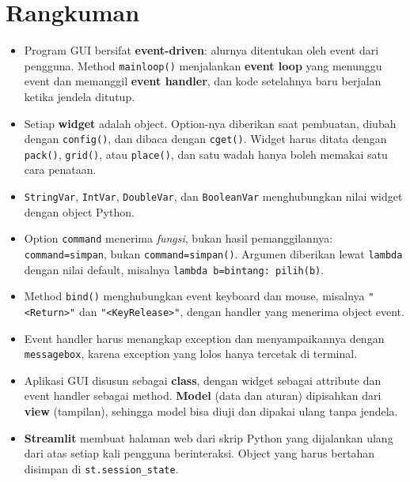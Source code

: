 \section{Rangkuman}

\begin{itemize}
  \item Program GUI bersifat \textbf{event-driven}: alurnya ditentukan oleh event dari pengguna. Method \texttt{mainloop()} menjalankan \textbf{event loop} yang menunggu event dan memanggil \textbf{event handler}, dan kode setelahnya baru berjalan ketika jendela ditutup.
  \item Setiap \textbf{widget} adalah object. Option-nya diberikan saat pembuatan, diubah dengan \texttt{config()}, dan dibaca dengan \texttt{cget()}. Widget harus ditata dengan \texttt{pack()}, \texttt{grid()}, atau \texttt{place()}, dan satu wadah hanya boleh memakai satu cara penataan.
  \item \texttt{StringVar}, \texttt{IntVar}, \texttt{DoubleVar}, dan \texttt{BooleanVar} menghubungkan nilai widget dengan object Python.
  \item Option \texttt{command} menerima \emph{fungsi}, bukan hasil pemanggilannya: \texttt{command=simpan}, bukan \texttt{command=simpan()}. Argumen diberikan lewat \texttt{lambda} dengan nilai default, misalnya \texttt{lambda b=bintang: pilih(b)}.
  \item Method \texttt{bind()} menghubungkan event keyboard dan mouse, misalnya \texttt{"<Return>"} dan \texttt{"<KeyRelease>"}, dengan handler yang menerima object event.
  \item Event handler harus menangkap exception dan menyampaikannya dengan \texttt{messagebox}, karena exception yang lolos hanya tercetak di terminal.
  \item Aplikasi GUI disusun sebagai \textbf{class}, dengan widget sebagai attribute dan event handler sebagai method. \textbf{Model} (data dan aturan) dipisahkan dari \textbf{view} (tampilan), sehingga model bisa diuji dan dipakai ulang tanpa jendela.
  \item \textbf{Streamlit} membuat halaman web dari skrip Python yang dijalankan ulang dari atas setiap kali pengguna berinteraksi. Object yang harus bertahan disimpan di \texttt{st.session\_state}.
\end{itemize}

